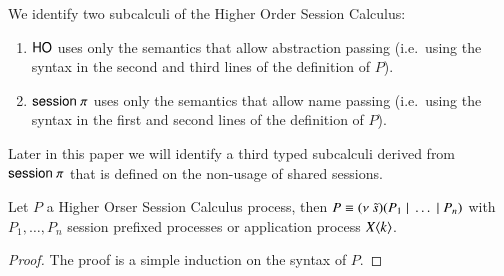 We identify two subcalculi of the Higher Order Session Calculus:
\begin{enumerate}
	\item	$\mathsf{HO}$ uses only the semantics that allow abstraction passing
		(i.e.\ using the syntax in the second and third lines of the definition of $P$).
	\item	$\mathsf{session\ }\pi$ uses only the semantics that allow name passing
		(i.e.\ using the syntax in the first and second lines of the definition of $P$).
\end{enumerate}

Later in this paper we will identify a third typed subcalculi derived
from $\mathsf{session\ }\pi$ that is defined on the non-usage of shared sessions.

\begin{proposition}[Normalisation]
	\label{prop:normal_form}
	Let $P$ a Higher Orser Session Calculus process, then
	$P \equiv (\nu\ \tilde{s})(P_1 \;|\; \dots \;|\; P_n)$ with
	$P_1, \dots, P_n$ session prefixed processes
	or application process $X\langle k \rangle$.
\end{proposition}

\begin{proof}
	The proof is a simple induction on the syntax of $P$.
\end{proof}
